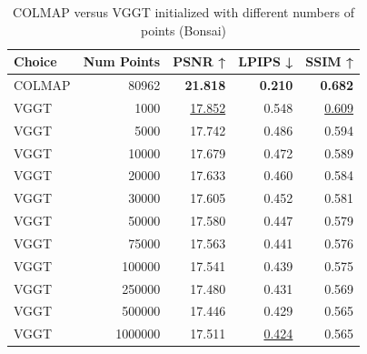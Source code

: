 \begin{table}[H]
\caption{COLMAP versus VGGT initialized with different numbers of points (Bonsai)}
\label{tab:02_num_points_bonsai}
\begin{tabular}{lrrrr}
\toprule
Choice & Num Points & PSNR ↑ & LPIPS ↓ & SSIM ↑ \\
\midrule
COLMAP & 80962 & \textbf{21.818} & \textbf{0.210} & \textbf{0.682} \\
VGGT & 1000 & \underline{17.852} & 0.548 & \underline{0.609} \\
VGGT & 5000 & 17.742 & 0.486 & 0.594 \\
VGGT & 10000 & 17.679 & 0.472 & 0.589 \\
VGGT & 20000 & 17.633 & 0.460 & 0.584 \\
VGGT & 30000 & 17.605 & 0.452 & 0.581 \\
VGGT & 50000 & 17.580 & 0.447 & 0.579 \\
VGGT & 75000 & 17.563 & 0.441 & 0.576 \\
VGGT & 100000 & 17.541 & 0.439 & 0.575 \\
VGGT & 250000 & 17.480 & 0.431 & 0.569 \\
VGGT & 500000 & 17.446 & 0.429 & 0.565 \\
VGGT & 1000000 & 17.511 & \underline{0.424} & 0.565 \\
\bottomrule
\end{tabular}
\end{table}
